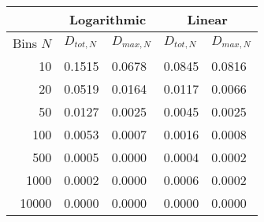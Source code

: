 %
	\begin{centering}
		{\footnotesize
		\begin{tabular}[h!t]{r || l | l || l | l |}
			\cline{2-5}
			\multicolumn{1}{c|}{}	 & \multicolumn{2}{c||}{Logarithmic} & \multicolumn{2}{c|}{Linear} \\
			\hline
			Bins $N$          &    $D_{tot,N}$      &    $D_{max,N}$   &    $D_{tot,N}$        &    $D_{max,N}$  \\
			\hline
            10   &            0.1515   &            0.0678   &            0.0845   &            0.0816  \\
			20   &            0.0519   &            0.0164   &            0.0117   &            0.0066  \\
			50   &            0.0127   &            0.0025   &            0.0045   &            0.0025  \\
			100   &            0.0053   &            0.0007   &            0.0016   &            0.0008  \\
			500   &            0.0005   &            0.0000   &            0.0004   &            0.0002  \\
			1000   &            0.0002   &            0.0000   &            0.0006   &            0.0002  \\
			10000   &            0.0000   &            0.0000   &            0.0000   &            0.0000  \\
			\hline
		\end{tabular}
	}
	\end{centering}
